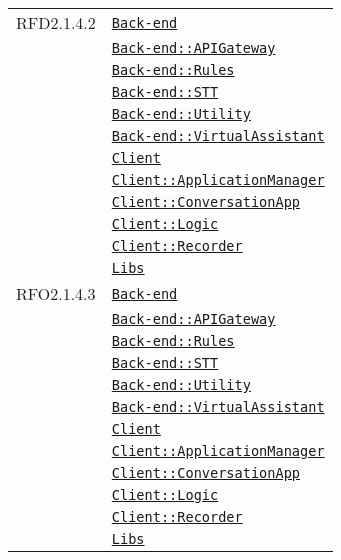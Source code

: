 \begin{longtable}{|>{\centering}m{3cm}|m{10cm}<{\centering}|}
RFD2.1.4.2 & \hyperref[Back-end]{\texttt{Back-end}}\\
& \hyperref[Back-end::APIGateway]{\texttt{Back-end::APIGateway}}\\
& \hyperref[Back-end::Rules]{\texttt{Back-end::Rules}}\\
& \hyperref[Back-end::STT]{\texttt{Back-end::STT}}\\
& \hyperref[Back-end::Utility]{\texttt{Back-end::Utility}}\\
& \hyperref[Back-end::VirtualAssistant]{\texttt{Back-end::VirtualAssistant}}\\
& \hyperref[Client]{\texttt{Client}}\\
& \hyperref[Client::ApplicationManager]{\texttt{Client::ApplicationManager}}\\
& \hyperref[Client::ConversationApp]{\texttt{Client::ConversationApp}}\\
& \hyperref[Client::Logic]{\texttt{Client::Logic}}\\
& \hyperref[Client::Recorder]{\texttt{Client::Recorder}}\\
& \hyperref[Libs]{\texttt{Libs}}\\ \hline

RFO2.1.4.3 & \hyperref[Back-end]{\texttt{Back-end}}\\
& \hyperref[Back-end::APIGateway]{\texttt{Back-end::APIGateway}}\\
& \hyperref[Back-end::Rules]{\texttt{Back-end::Rules}}\\
& \hyperref[Back-end::STT]{\texttt{Back-end::STT}}\\
& \hyperref[Back-end::Utility]{\texttt{Back-end::Utility}}\\
& \hyperref[Back-end::VirtualAssistant]{\texttt{Back-end::VirtualAssistant}}\\
& \hyperref[Client]{\texttt{Client}}\\
& \hyperref[Client::ApplicationManager]{\texttt{Client::ApplicationManager}}\\
& \hyperref[Client::ConversationApp]{\texttt{Client::ConversationApp}}\\
& \hyperref[Client::Logic]{\texttt{Client::Logic}}\\
& \hyperref[Client::Recorder]{\texttt{Client::Recorder}}\\
& \hyperref[Libs]{\texttt{Libs}}\\ \hline


\end{longtable}
